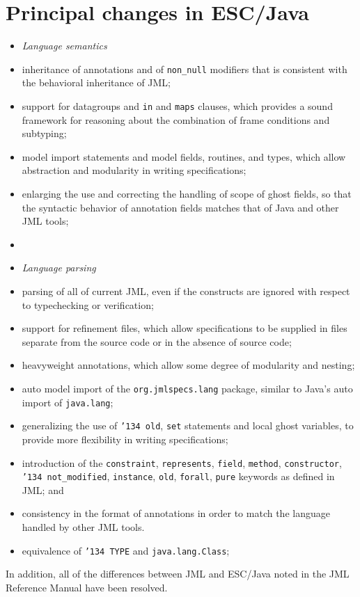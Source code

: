 \documentclass{llncs}
\begin{document}
\section{Principal changes in ESC/Java}
\setlength{\partopsep}{0in}\setlength{\parskip}{0in}\setlength{\itemsep}{0in}\setlength{\topsep}{0in}
\begin{itemize}
\setlength{\partopsep}{0in}\setlength{\parskip}{0in}\setlength{\itemsep}{0in}\setlength{\topsep}{0in}
\item[] \textit{Language semantics}
\item inheritance of annotations and of \texttt{non\_null}
  modifiers that is consistent with the behavioral inheritance of JML;
\item support for datagroups and \texttt{in} and \texttt{maps} clauses, which provides a sound framework for reasoning about the combination of frame conditions and subtyping;
\item model import statements and model fields, routines, and types, which allow abstraction 
and modularity in writing specifications;
\item enlarging the use and correcting the handling of scope of ghost fields, so that the syntactic behavior 
of annotation fields matches that of Java and other JML tools;
\item[]
\item[] \textit{Language parsing}
\item parsing of all of current JML, even if the constructs are
  ignored with respect to typechecking or verification;
\item support for refinement files, which allow specifications to be supplied in files separate from the source code or in the absence of source code;
\item heavyweight annotations, which allow some degree of modularity and nesting;
\item auto model import of the \texttt{org.jmlspecs.lang} package, similar to Java's auto import of \texttt{java.lang};
\item generalizing the use of \texttt{\char'134 old}, \texttt{set} statements and local ghost variables, to provide more flexibility in writing specifications;
\item introduction of the \texttt{constraint}, \texttt{represents}, \texttt{field}, \texttt{method},
\texttt{constructor}, 
\texttt{\char'134 not\_modified}, \texttt{instance}, \texttt{old}, \texttt{forall},
\texttt{pure} keywords as defined in JML; and
\item consistency in the format of annotations in order to match the language handled by other JML tools.
\item equivalence of \texttt{\char'134 TYPE} and \texttt{java.lang.Class};
\end{itemize}
In addition, all of the differences between JML and ESC/Java noted in
the JML Reference Manual have been resolved.
\end{document}
